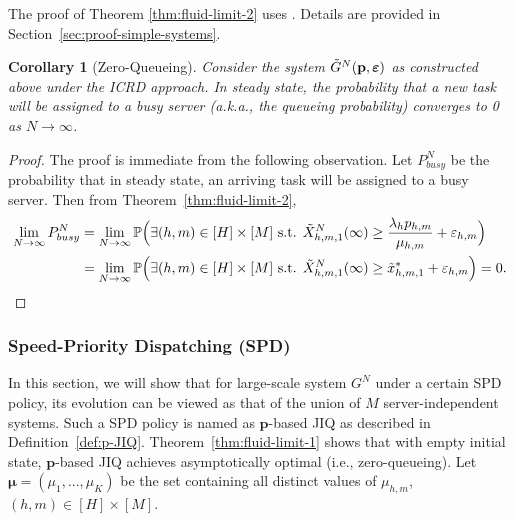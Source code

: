 \documentclass[11pt, reqno]{article}
\newtheorem{corollary}[theorem]{Corollary}
\numberwithin{equation}{section}
\numberwithin{theorem}{section}
\newcommand{\PP}{\mathbb{P}}  				%
\begin{document}
The proof of Theorem \ref{thm:fluid-limit-2} uses \cite[Theorem 2]{AS15}. 
Details are provided in Section~\ref{sec:proof-simple-systems}.
\begin{corollary}[Zero-Queueing]
    Consider the system $\Tilde{G}^N(\mathbf{p},\boldsymbol\varepsilon)$ as constructed above under the ICRD approach. In steady state, the probability that a new task will be assigned to a busy server (a.k.a., the queueing probability) converges to 0 as $N\rightarrow\infty$.
\end{corollary}
\begin{proof}
The proof is immediate from the following observation.
    Let $P^N_{busy}$ be the probability that in steady state, an arriving task will be assigned to a busy server. Then from Theorem~\ref{thm:fluid-limit-2}, 
    \begin{equation*}
        \begin{split}
\lim_{N\rightarrow\infty}P^N_{busy}&=\lim_{N\rightarrow\infty}\PP\Big(\exists (h,m)\in[H]\times[M]\text{ s.t. }\Tilde{X}^N_{h,m,1}(\infty)\geq \frac{\lambda_hp_{h,m}}{\mu_{h,m}}+\varepsilon_{h,m}\Big)\\
&=\lim_{N\rightarrow\infty}\PP\Big(\exists (h,m)\in[H]\times[M]\text{ s.t. }\Tilde{X}^N_{h,m,1}(\infty)\geq \Tilde{x}^*_{h,m,1}+\varepsilon_{h,m}\Big) = 0.
        \end{split}
    \end{equation*}
\end{proof}




\subsubsection{Speed-Priority Dispatching (SPD)}\label{sec:server-indep.}
In this section, we will show that for large-scale system $G^N$ under a certain SPD policy, its evolution can be viewed as that of the union of $M$ server-independent systems. Such a SPD policy is named as $\mathbf{p}$-based JIQ as described in Definition~\ref{def:p-JIQ}. 
Theorem~\ref{thm:fluid-limit-1} shows that with empty initial state, $\mathbf{p}$-based JIQ achieves asymptotically optimal (i.e., zero-queueing).
Let $\boldsymbol\mu=(\mu_1,...,\mu_K)$ be the set containing all distinct values of $\mu_{h,m}$, $(h,m)\in [H]\times [M]$.\\
\end{document}
